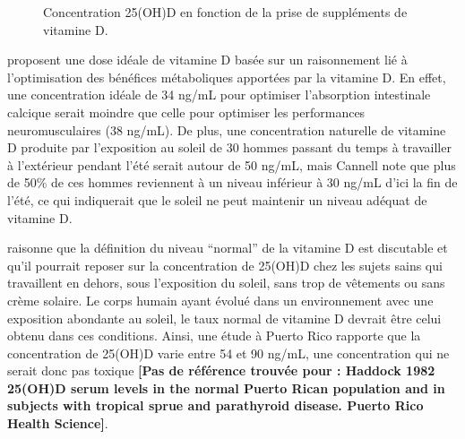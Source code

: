 \documentclass[
  a4paper,
  DIV=11,
  numbers=noendperiod,
  listof=totoc]{scrreprt}
\begin{document}
\begin{figure}
\begin{minipage}[t]{0.50\linewidth}
{{}

\caption{\label{fig-vd-pk-heaney}Concentration 25(OH)D en fonction de la
prise de suppléments de vitamine D. \textcite{Heaney.2015}}

}

\end{minipage}%

\end{figure}

\textcite{Cannell.2008} proposent une dose idéale de vitamine D basée
sur un raisonnement lié à l'optimisation des bénéfices métaboliques
apportées par la vitamine D. En effet, une concentration idéale de 34
ng/mL pour optimiser l'absorption intestinale calcique serait moindre
que celle pour optimiser les performances neuromusculaires (38 ng/mL).
De plus, une concentration naturelle de vitamine D produite par
l'exposition au soleil de 30 hommes passant du temps à travailler à
l'extérieur pendant l'été serait autour de 50 ng/mL, mais Cannell note
que plus de 50\% de ces hommes reviennent à un niveau inférieur à 30
ng/mL d'ici la fin de l'été, ce qui indiquerait que le soleil ne peut
maintenir un niveau adéquat de vitamine D.

\textcite{Hollis.2005} raisonne que la définition du niveau ``normal''
de la vitamine D est discutable et qu'il pourrait reposer sur la
concentration de 25(OH)D chez les sujets sains qui travaillent en
dehors, sous l'exposition du soleil, sans trop de vêtements ou sans
crème solaire. Le corps humain ayant évolué dans un environnement avec
une exposition abondante au soleil, le taux normal de vitamine D devrait
être celui obtenu dans ces conditions. Ainsi, une étude à Puerto Rico
rapporte que la concentration de 25(OH)D varie entre 54 et 90 ng/mL, une
concentration qui ne serait donc pas toxique \textbf{{[}Pas de référence
trouvée pour : Haddock 1982 25(OH)D serum levels in the normal Puerto
Rican population and in subjects with tropical sprue and parathyroid
disease. Puerto Rico Health Science{]}}.
\end{document}
